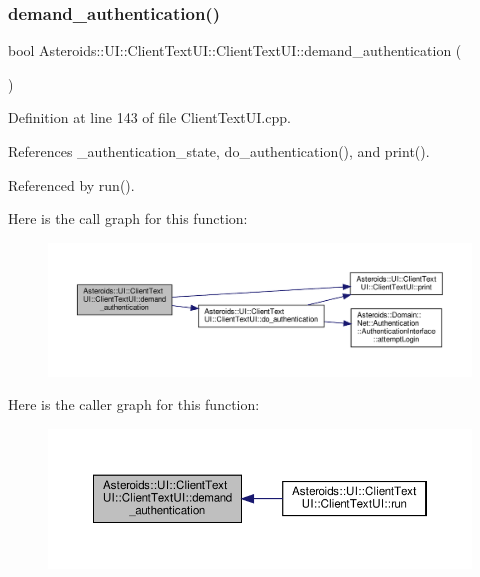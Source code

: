 \subsubsection{\texorpdfstring{demand\+\_\+authentication()}{demand\_authentication()}}
{\footnotesize\ttfamily bool Asteroids\+::\+U\+I\+::\+Client\+Text\+U\+I\+::\+Client\+Text\+U\+I\+::demand\+\_\+authentication (\begin{DoxyParamCaption}{ }\end{DoxyParamCaption})\hspace{0.3cm}{\ttfamily [private]}}



Definition at line 143 of file Client\+Text\+U\+I.\+cpp.



References \+\_\+authentication\+\_\+state, do\+\_\+authentication(), and print().



Referenced by run().

Here is the call graph for this function\+:\nopagebreak
\begin{figure}[H]
\begin{center}
\leavevmode
\includegraphics[width=350pt]{classAsteroids_1_1UI_1_1ClientTextUI_1_1ClientTextUI_ac3cec81751843b8e8fa503af51b17546_cgraph}
\end{center}
\end{figure}
Here is the caller graph for this function\+:\nopagebreak
\begin{figure}[H]
\begin{center}
\leavevmode
\includegraphics[width=350pt]{classAsteroids_1_1UI_1_1ClientTextUI_1_1ClientTextUI_ac3cec81751843b8e8fa503af51b17546_icgraph}
\end{center}
\end{figure}
\mbox{\label{classAsteroids_1_1UI_1_1ClientTextUI_1_1ClientTextUI_a96251b4d6623fda575f39b84677b0ed5}} 
